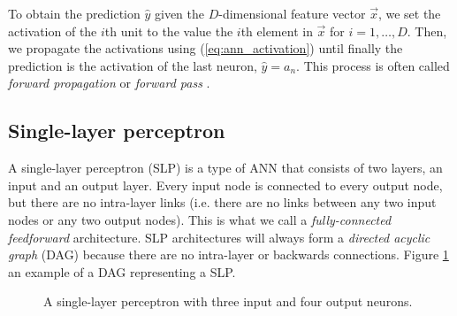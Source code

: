 To obtain the prediction $\hat{y}$ given the $D$-dimensional feature vector $\vec{x}$, we set the activation of the $i$th unit to the value the $i$th element in $\vec{x}$ for $i=1,\dots,D$.
Then, we propagate the activations using (\ref{eq:ann_activation}) until finally the prediction is the activation of the last neuron, $\hat{y}=a_n$.
This process is often called \textit{forward propagation} or \textit{forward pass} \cite{russell2010}.

\subsection{Single-layer perceptron}
A single-layer perceptron (SLP) is a type of ANN that consists of two layers, an input and an output layer.
Every input node is connected to every output node, but there are no intra-layer links (i.e. there are no links between any two input nodes or any two output nodes). 
This is what we call a \textit{fully-connected feedforward} architecture.
SLP architectures will always form a \textit{directed acyclic graph} (DAG) because there are no intra-layer or backwards connections.
Figure \ref{fig:single_layer_perceptron} an example of a DAG representing a SLP.

\begin{figure}[h]
    \begin{center}
    \end{center}
    \caption{A single-layer perceptron with three input and four output neurons.}
    \label{fig:single_layer_perceptron}
\end{figure}

